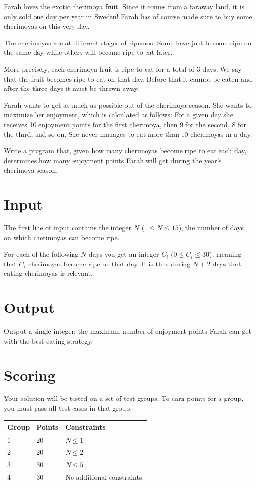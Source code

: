 
Farah loves the exotic cherimoya fruit. Since it comes from a
faraway land, it is only sold one day per year in Sweden! Farah has of course
made sure to buy some cherimoyas on this very day.

The cherimoyas are at different stages of ripeness. Some have just become ripe on the same day while
others will become ripe to eat later.

More precisely, each cherimoya fruit is ripe to eat for a total of 3 days. We
say that the fruit becomes ripe to eat on that day. Before that it cannot be eaten and after the
three days it must be thrown away.

Farah wants to get as much as possible out of the cherimoya season. She wants to
maximize her enjoyment, which is calculated as follows: For a given day she receives 10
enjoyment points for the first cherimoya, then 9 for the second, 8 for the
third, and so on. She never manages to eat more than 10 cherimoyas in a day.

Write a program that, given how many cherimoyas become ripe to eat each day,
determines how many enjoyment points Farah will get during the year's
cherimoya season.

\section*{Input}
The first line of input contains the integer $N$ ($1 \leq N \leq 15$), the number
of days on which cherimoyas can become ripe.

For each of the following $N$ days you get an integer $C_i$ ($0 \leq C_i \leq 30$),
meaning that $C_i$ cherimoyas become ripe on that day.
It is thus during $N+2$ days that eating cherimoyas is relevant.

\section*{Output}
Output a single integer: the maximum number of enjoyment points Farah can
get with the best eating strategy.

\section*{Scoring}
Your solution will be tested on a set of test groups.
To earn points for a group, you must pass all test cases in that group.

\noindent
\begin{tabular}{| l | l | p{12cm} |}
  \hline
  \textbf{Group} & \textbf{Points} & \textbf{Constraints} \\ \hline
  $1$    & $20$       & $N \leq 1$ \\ \hline
  $2$    & $20$       & $N \leq 2$ \\ \hline
  $3$    & $30$       & $N \leq 5$ \\ \hline
  $4$    & $30$       & No additional constraints. \\ \hline
\end{tabular}


